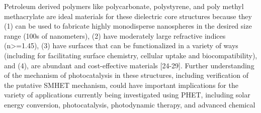 \documentclass[journal=jacsat,manuscript=article]{achemso}
\begin{document}
Petroleum derived polymers like polycarbonate, polystyrene, and poly methyl methacrylate are ideal materials for these dielectric core structures because they (1) can be used to fabricate highly monodisperse nanospheres in the desired size range (100s of nanometers), (2) have moderately large refractive indices (n>=1.45), (3) have surfaces that can be functionalized in a variety of ways (including for facilitating surface chemistry, cellular uptake and biocompatibility), and (4), are abundant and cost-effective materials [24-29].  Further understanding of the mechanism of photocatalysis in these structures, including verification of the putative SMHET mechanism, could have important implications for the variety of applications currently being investigated using PHET, including solar energy conversion, photocatalysis, photodynamic therapy, and advanced chemical 


\end{document}
